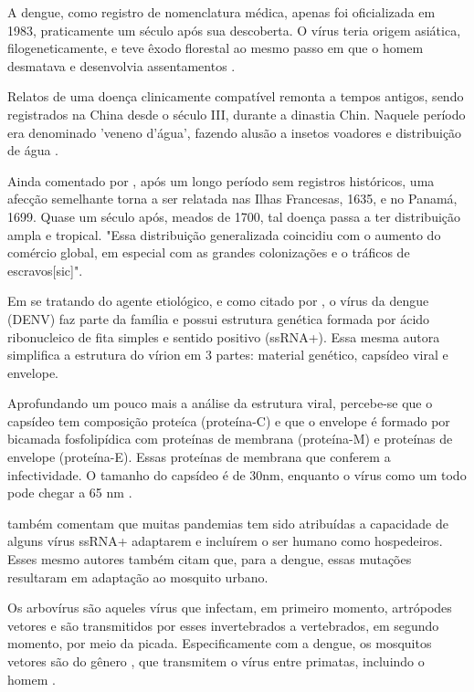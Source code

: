 \indent A dengue, como registro de nomenclatura médica, apenas foi oficializada em 1983, praticamente um século após sua descoberta. O vírus teria origem asiática, filogeneticamente, e teve êxodo florestal ao mesmo passo em que o homem desmatava e desenvolvia assentamentos \cite{Valle2015Dengue}.

\indent Relatos de uma doença clinicamente compatível remonta a tempos antigos, sendo registrados na China desde o século III, durante a dinastia Chin. Naquele período era denominado 'veneno d'água', fazendo alusão a insetos voadores e distribuição de água \cite{Valle2015Dengue}.

\indent Ainda comentado por , após um longo período sem registros históricos, uma afecção semelhante torna a ser relatada nas Ilhas Francesas, 1635, e no Panamá, 1699. Quase um século após, meados de 1700, tal doença passa a ter distribuição ampla e tropical. "Essa distribuição generalizada coincidiu com o aumento do comércio global, em especial com as grandes colonizações e o tráficos de escravos[sic]".

\indent Em se tratando do agente etiológico, e como citado por , o vírus da dengue (\acrfull{DENV}) faz parte da família  e possui estrutura genética formada por ácido ribonucleico de fita simples e sentido positivo (\acrfull{ssRNA+}). Essa mesma autora simplifica a estrutura do vírion em 3 partes: material genético, capsídeo viral e envelope.

\indent Aprofundando um pouco mais a análise da estrutura viral, percebe-se que o capsídeo tem composição proteíca (proteína-C) e que o envelope é formado por bicamada fosfolipídica com proteínas de membrana (proteína-M) e proteínas de envelope (proteína-E). Essas proteínas de membrana que conferem a infectividade. O tamanho do capsídeo é de 30nm, enquanto o vírus como um todo pode chegar a 65 nm \cite{Fiocruz2010Atlas}. 

 também comentam que muitas pandemias tem sido atribuídas a capacidade de alguns vírus \acrshort{ssRNA+} adaptarem e incluírem o ser humano como hospedeiros. Esses mesmo autores também citam que, para a dengue, essas mutações resultaram em adaptação ao mosquito urbano.

\indent Os arbovírus são aqueles vírus que infectam, em primeiro momento, artrópodes vetores e são transmitidos por esses invertebrados a vertebrados, em segundo momento, por meio da picada. Especificamente com a dengue, os mosquitos vetores são do gênero , que transmitem o vírus entre primatas, incluindo o homem \cite{Valle2015Dengue}.

